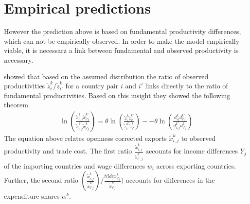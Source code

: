 \section{Empirical predictions}
However the prediction above is based on fundamental productivity differences, which can not be empirically observed.
 In order to make the model empirically viable, it is necessarz a link between fundamental and observed productivity is necessary. \par
  \textcite{costinot} showed that based on the assumed distribution the ratio of observed productivities $\tilde{z}^k_i / \tilde{z}^k_{i'}$ for a country pair $i$ and $i'$
links directly to the ratio of fundamental productivities.
Based on this insight they showed the following theorem.
\begin{align} \ln \left( \frac{\tilde{x}_{i,j}^k \tilde{x}^{k'}_{i'j}}{\tilde{x}_{i,j}^{k'} \tilde{x}^{k}_{i'j}} \right) = \theta \ln \left( \frac{\tilde{z}_{i}^k \tilde{z}^{k'}_{i'}}{\tilde{z}_{i}^{k'} \tilde{z}^{k}_{i'}} \right)--\theta \ln \left( \frac{ d_{ij}^k d^{k'}_{i'j}}{d_{i,j}^{k'} {d}^{k}_{i'j}} \right) \end{align}
The equation above relates openness corrected exports $\tilde{x}_{i,j}^k$ to observed productivity and trade cost.
The first ratio  $\frac{\tilde{x}_{i,j}^k} { \tilde{x}_{i', j}^{k'} }$ accounts for income differences  $Y_j$ of the importing countries and wage differences $w_i$ across exporting countries.
Further, the second ratio $(\frac{\tilde{x}_{i,j}^k}{\tilde{x}^{k'}_{i'j}})/ \frac{tilde{x}^{k}_{i'j}}{\tilde{x}^{k'}_{i'j}}) $ accounts for differences in the expenditure shares $\alpha^k$. %

